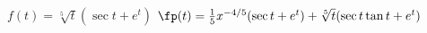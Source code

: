 {$ f(t) = \sqrt[5]{t}(\sec t + e^t)$
}
{$\fp(t) = \frac15x^{-4/5}(\sec t+ e^t) + \sqrt[5]{t}(\sec t\tan t + e^t)$
}

